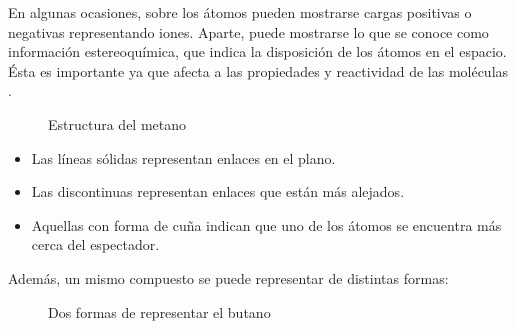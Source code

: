  En algunas ocasiones, sobre los átomos pueden mostrarse cargas positivas o negativas representando iones. Aparte, puede mostrarse lo que se conoce como información estereoquímica, que indica la disposición de los átomos en el espacio. Ésta es importante ya que afecta a las propiedades y reactividad de las moléculas \cite{estereoquimica,structrep}.

 \begin{figure}[H]
\centering
    \caption{Estructura del metano} \label{fig:figura2}
\end{figure}

\begin{itemize}
    \item Las líneas sólidas representan enlaces en el plano.
    \item Las discontinuas representan enlaces que están más alejados.
    \item Aquellas con forma de cuña indican que uno de los átomos se encuentra más cerca del espectador. 
\end{itemize}

Además, un mismo compuesto se puede representar de distintas formas:
\begin{figure}[H]
\centering
    \caption{Dos formas de representar el butano} \label{fig:figura2}
\end{figure}

